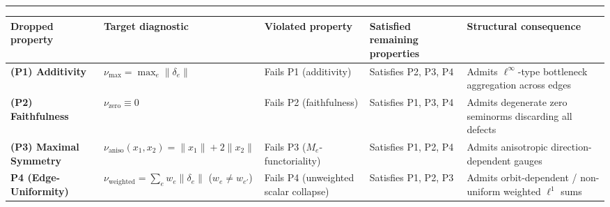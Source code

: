 \documentclass[
  11pt,
]{article}
\begin{document}
\begin{center}\rule{0.5\linewidth}{0.5pt}\end{center}

\begin{longtable}[]{@{}
  >{\raggedright\arraybackslash}p{}
  >{\raggedright\arraybackslash}p{}
  >{\raggedright\arraybackslash}p{}
  >{\raggedright\arraybackslash}p{}
  >{\raggedright\arraybackslash}p{}@{}}
\toprule\noalign{}
\begin{minipage}[b]{\linewidth}\raggedright
Dropped property
\end{minipage} & \begin{minipage}[b]{\linewidth}\raggedright
Target diagnostic
\end{minipage} & \begin{minipage}[b]{\linewidth}\raggedright
Violated property
\end{minipage} & \begin{minipage}[b]{\linewidth}\raggedright
Satisfied remaining properties
\end{minipage} & \begin{minipage}[b]{\linewidth}\raggedright
Structural consequence
\end{minipage} \\
\midrule\noalign{}
\endhead
\bottomrule\noalign{}
\endlastfoot
\textbf{(P1) Additivity} & \(\nu_{\max} = \max_e \|\delta_e\|\) & Fails P1 (additivity) & Satisfies P2, P3, P4 & Admits \(\ell^\infty\)-type bottleneck aggregation across edges \\
\textbf{(P2) Faithfulness} & \(\nu_{\text{zero}} \equiv 0\) & Fails P2 (faithfulness) & Satisfies P1, P3, P4 & Admits degenerate zero seminorms discarding all defects \\
\textbf{(P3) Maximal Symmetry} & \(\nu_{\text{aniso}}(x_1, x_2) = \|x_1\| + 2\|x_2\|\) & Fails P3 (\(M_e\)-functoriality) & Satisfies P1, P2, P4 & Admits anisotropic direction-dependent gauges \\
\textbf{P4 (Edge-Uniformity)} & \(\nu_{\text{weighted}} = \sum_e w_e \|\delta_e\|\) (\(w_e \neq w_{e'}\)) & Fails P4 (unweighted scalar collapse) & Satisfies P1, P2, P3 & Admits orbit-dependent / non-uniform weighted \(\ell^1\) sums \\
\end{longtable}
\end{document}
